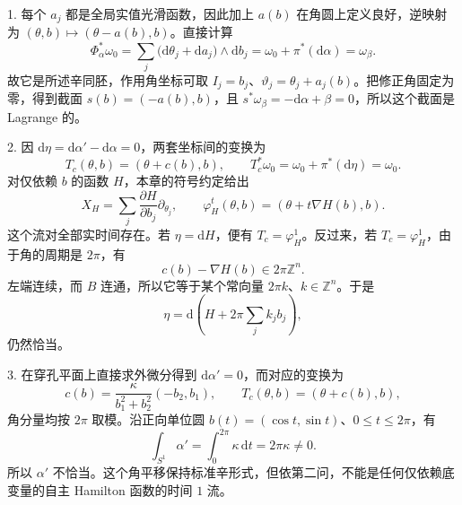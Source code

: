 \begin{solution}
	1. 每个 \(a_j\) 都是全局实值光滑函数，因此加上 \(a(b)\) 在角圆上定义良好，逆映射为 \((\theta,b)\mapsto(\theta-a(b),b)\)。直接计算
	\[
		\Phi_\alpha^*\omega_0
		=\sum_j\bigl(\mathrm{d}\theta_j+\mathrm{d}a_j\bigr)\wedge\mathrm{d}b_j
		=\omega_0+\pi^*(\mathrm{d}\alpha)=\omega_\beta.
	\]
	故它是所述辛同胚，作用角坐标可取 \(I_j=b_j\)、\(\vartheta_j=\theta_j+a_j(b)\)。把修正角固定为零，得到截面 \(s(b)=(-a(b),b)\)，且
	\(s^*\omega_\beta=-\mathrm{d}\alpha+\beta=0\)，所以这个截面是 Lagrange 的。

	2. 因 \(\mathrm{d}\eta=\mathrm{d}\alpha'-\mathrm{d}\alpha=0\)，两套坐标间的变换为
	\[
		T_c(\theta,b)=(\theta+c(b),b),
		\qquad T_c^*\omega_0=\omega_0+\pi^*(\mathrm{d}\eta)=\omega_0.
	\]
	对仅依赖 \(b\) 的函数 \(H\)，本章的符号约定给出
	\[
		X_H=\sum_j\frac{\partial H}{\partial b_j}\partial_{\theta_j},
		\qquad \varphi_H^t(\theta,b)=(\theta+t\nabla H(b),b).
	\]
	这个流对全部实时间存在。若 \(\eta=\mathrm{d}H\)，便有 \(T_c=\varphi_H^1\)。反过来，若 \(T_c=\varphi_H^1\)，由于角的周期是 \(2\pi\)，有
	\[
		c(b)-\nabla H(b)\in2\pi\mathbb Z^n.
	\]
	左端连续，而 \(B\) 连通，所以它等于某个常向量 \(2\pi k\)、\(k\in\mathbb Z^n\)。于是
	\[
		\eta=\mathrm{d}\!\left(H+2\pi\sum_jk_jb_j\right),
	\]
	仍然恰当。

	3. 在穿孔平面上直接求外微分得到 \(\mathrm{d}\alpha'=0\)，而对应的变换为
	\[
		c(b)=\frac{\kappa}{b_1^2+b_2^2}(-b_2,b_1),
		\qquad T_c(\theta,b)=(\theta+c(b),b),
	\]
	角分量均按 \(2\pi\) 取模。沿正向单位圆 \(b(t)=(\cos t,\sin t)\)、\(0\le t\le2\pi\)，有
	\[
		\int_{S^1}\alpha'=\int_0^{2\pi}\kappa\,\mathrm{d}t=2\pi\kappa\ne0.
	\]
	所以 \(\alpha'\) 不恰当。这个角平移保持标准辛形式，但依第二问，不能是任何仅依赖底变量的自主 Hamilton 函数的时间 \(1\) 流。
\end{solution}


